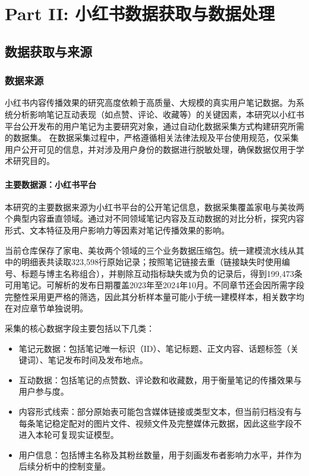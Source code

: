 \part{Part II: 小红书数据获取与数据处理}



\chapter{数据获取与来源}

\section{数据来源}
小红书内容传播效果的研究高度依赖于高质量、大规模的真实用户笔记数据。为系统分析影响笔记互动表现（如点赞、评论、收藏等）的关键因素，本研究以小红书平台公开发布的用户笔记为主要研究对象，通过自动化数据采集方式构建研究所需的数据集。
在数据采集过程中，严格遵循相关法律法规及平台使用规范，仅采集用户公开可见的信息，并对涉及用户身份的数据进行脱敏处理，确保数据仅用于学术研究目的。
\subsection{主要数据源：小红书平台}
本研究的主要数据来源为小红书平台的公开笔记信息，数据采集覆盖家电与美妆两个典型内容垂直领域。通过对不同领域笔记内容及互动数据的对比分析，探究内容形式、文本特征及用户影响力等因素对笔记传播效果的影响。

当前仓库保存了家电、美妆两个领域的三个业务数据压缩包。统一建模流水线从其中的明细表共读取323,598行原始记录；按照笔记链接去重（链接缺失时使用编号、标题与博主名称组合），并剔除互动指标缺失或为负的记录后，得到199,473条可用笔记。可解析的发布日期覆盖2023年至2024年10月。不同章节还会因所需字段完整性采用更严格的筛选，因此其分析样本量可能小于统一建模样本，相关数字均在对应章节单独说明。

采集的核心数据字段主要包括以下几类：
\begin{itemize}
	\item 笔记元数据：包括笔记唯一标识（ID）、笔记标题、正文内容、话题标签（关键词）、笔记发布时间及发布地点。
	\item 互动数据：包括笔记的点赞数、评论数和收藏数，用于衡量笔记的传播效果与用户参与度。
	\item 内容形式线索：部分原始表可能包含媒体链接或类型文本，但当前归档没有与每条笔记稳定配对的图片文件、视频文件及完整媒体元数据，因此这些字段不进入本轮可复现实证模型。
	\item 用户信息：包括博主名称及其粉丝数量，用于刻画发布者影响力水平，并作为后续分析中的控制变量。
\end{itemize}

